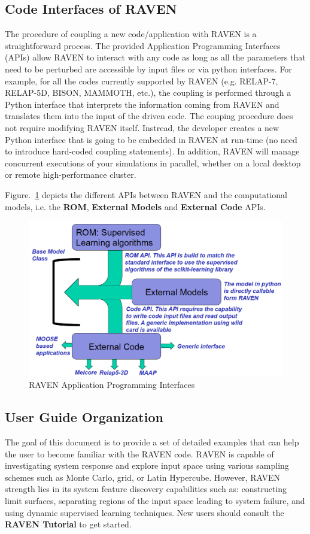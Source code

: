 

\subsection{Code Interfaces of RAVEN}
The procedure of coupling a new code/application with RAVEN is a straightforward process. The provided Application
Programming Interfaces (APIs) allow RAVEN to interact with any code as long as all the parameters that need to be
perturbed are accessible by input files or via python interfaces. For example, for all the codes currently
supported by RAVEN (e.g. RELAP-7, RELAP-5D, BISON, MAMMOTH, etc.), the coupling is performed through a Python interface
that interprets the information coming from RAVEN and translates them into the input of the driven code. The couping procedure
does not require modifying RAVEN itself. Instread, the developer creates a new Python interface that is going to
be embedded in RAVEN at run-time (no need to introduce hard-coded coupling statements). In addition, RAVEN will
manage concurrent executions of your simulations in parallel, whether on a local desktop or remote high-performance cluster.

Figure.~\ref{fig:modelAPIs} depicts the different APIs between RAVEN and the computational models, i.e. the
\textbf{ROM}, \textbf{External Models} and \textbf{External Code} APIs. 

\begin{figure}[h!]
  \includegraphics[width=\textwidth]{pics/modelAPIs.png}
  \caption{RAVEN Application Programming Interfaces}
  \label{fig:modelAPIs}
\end{figure}

\clearpage

\subsection{User Guide Organization}
The goal of this document is to provide a set of detailed examples that can help the user to become familiar with
the RAVEN code. RAVEN is capable of investigating system response and explore input space using various
sampling schemes such as Monte Carlo, grid, or Latin Hypercube. However, RAVEN strength lies in its system feature
discovery capabilities such as: constructing limit surfaces, separating regions of the input space leading to
system failure, and using dynamic supervised learning techniques. New users should consult the \textbf{RAVEN Tutorial}
to get started.

